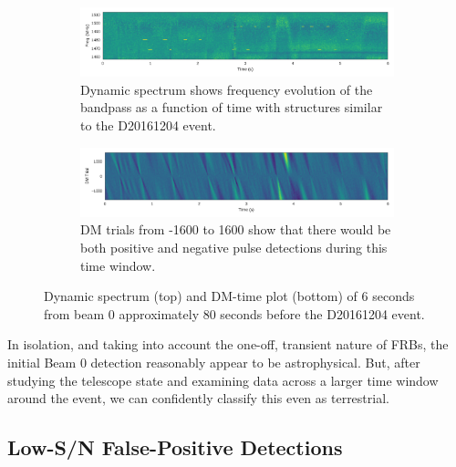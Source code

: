 \documentclass[a4paper,fleqn,usenatbib]{mnras}
\begin{document}
\begin{figure}
    \centering
    \begin{subfigure}[t]{1.0\textwidth}
        \centering\captionsetup{width=.95\linewidth}
        \includegraphics[width=1.0\textwidth]{figures/D20161204_spect_buf21_Beam0.pdf}
        \caption{Dynamic spectrum shows frequency evolution of the bandpass as a
        function of time with structures similar to the D20161204 event.
        }
        \label{fig:beam0_dynamic_spec_80s}
    \end{subfigure}
    \begin{subfigure}[t]{1.0\textwidth}
        \centering\captionsetup{width=.95\linewidth}
        \includegraphics[width=1.0\textwidth]{figures/D20161204_dmtrials_buf21_Beam0.pdf}
        \caption{DM trials from -1600 to 1600 show that there would be both
        positive and negative pulse detections during this time window.
        }
        \label{fig:beam0_dmtrials_80s}
    \end{subfigure}
    \caption{Dynamic spectrum (top) and DM-time plot (bottom) of 6 seconds from
    beam 0 approximately 80 seconds before the D20161204 event.
    }
    \label{fig:beamo0_80s}
\end{figure}

In isolation, and taking into account the one-off, transient nature of FRBs, the
initial Beam 0 detection reasonably appear to be astrophysical. But, after
studying the telescope state and examining data across a larger time window around
the event, we can confidently classify this even as terrestrial.

\subsection{Low-S/N False-Positive Detections}
\label{sec:low_snr}
\end{document}
